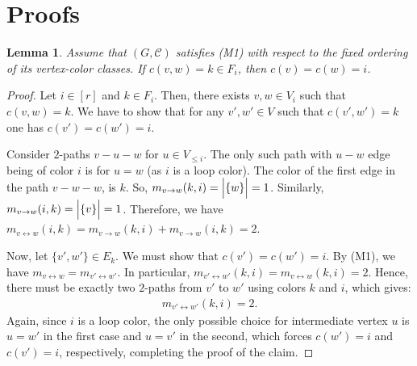 \documentclass[12pt]{amsart}
\theoremstyle{plain}
\newtheorem{lemma}[theorem]{Lemma}
\theoremstyle{definition}
\theoremstyle{remark}
\newcommand{\1}{\mathbf{1}}
\begin{document}
\section{Proofs}\label{sec:proofs}

\begin{lemma}\label{lem:edge_regularity_on_diagonal}
Assume that $(G,\mathcal{C})$ satisfies (M1) with respect to the fixed ordering of its vertex-color classes. If $c(v,w)=k\in F_i$, then $c(v)=c(w)=i$.
\end{lemma}
\begin{proof}
Let $i\in [r]$ and $k\in F_i$. Then, there exists $v,w\in V_i$ such that $c(v,w)=k$. We have to show that for any $v',w'\in V$ such that $c(v',w') = k$ one has $c(v') = c(w') = i$.

Consider $2$-paths $v-u-w$ for $u\in V_{\le i}$. The only such path with $u-w$ edge being of color $i$ is for $u=w$ (as $i$ is a loop color). The color of the first edge in the path $v-w-w$, is $k$. So, $m_{v\to w}(k, i) =\Bigl| \{w \} \Bigr|= 1$. Similarly, $m_{v\to w}(i, k) =\Bigl| \{v \} \Bigr|= 1$. Therefore, we have $m_{v\leftrightarrow w}(i, k) = m_{v\to w}(k, i) + m_{v\to w}(i, k) = 2$.

Now, let $\{v',w'\}\in E_k$. We must show that $c(v')=c(w')=i$.
By (M1), we have $m_{v\leftrightarrow w} = m_{v'\leftrightarrow w'}$. In particular, $m_{v'\leftrightarrow w'}(k,i) = m_{v\leftrightarrow w}(k,i) = 2$. Hence, there must be exactly two $2$-paths from $v'$ to $w'$ using colors $k$ and $i$, which gives:
\begin{align*}
 m_{v'\leftrightarrow w'}(k, i) =2.
\end{align*}
Again, since $i$ is a loop color, the only possible choice for intermediate vertex $u$ is $u=w'$ in the first case and $u=v'$ in the second, which forces $c(w') = i$ and $c(v') = i$, respectively, completing the proof of the claim.
\end{proof}
\end{document}
